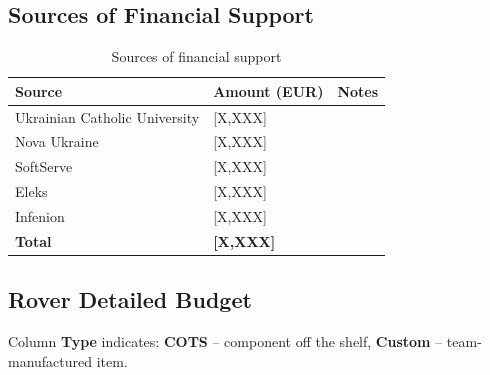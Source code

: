 \subsection{Sources of Financial Support}
\label{subsec:budget_sources}

\begin{table}[H]
    \centering
    \caption{Sources of financial support}
    \label{tab:budget_sources}
    \begin{tabular}{L{5cm} R{2.5cm} L{5cm}}
        \toprule
        \textbf{Source} & \textbf{Amount (EUR)} & \textbf{Notes} \\
        \midrule
        Ukrainian Catholic University           & [X,XXX] & \\
        Nova Ukraine & [X,XXX] & \\
        SoftServe & [X,XXX] & \\
        Eleks         & [X,XXX] & \\
        Infenion                      & [X,XXX] & \\
        \midrule
        \textbf{Total}             & \textbf{[X,XXX]} & \\
        \bottomrule
    \end{tabular}
\end{table}

\subsection{Rover Detailed Budget}
\label{subsec:rover_detailed_budget}

Column \textbf{Type} indicates: \textbf{COTS} -- component off the shelf,
\textbf{Custom} -- team-manufactured item.


